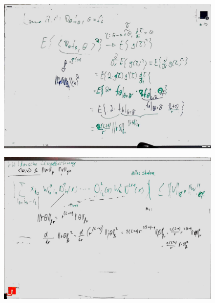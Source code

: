 \begin{figure}[htb]
	\centering
	\includegraphics[width=\textwidth]{whiteboard_notes/24.jpg}
\end{figure}

\begin{figure}[htb]
	\centering
	\includegraphics[width=\textwidth]{whiteboard_notes/25.jpg}
\end{figure}